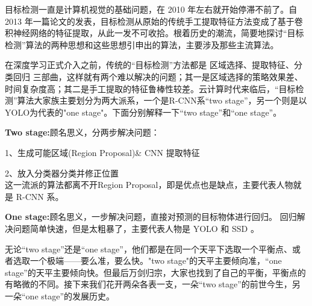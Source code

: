 目标检测一直是计算机视觉的基础问题，在 2010 年左右就开始停滞不前了。自 2013 年一篇论文的发表，目标检测从原始的传统手工提取特征方法变成了基于卷积神经网络的特征提取，从此一发不可收拾。根着历史的潮流，简要地探讨“目标检测”算法的两种思想和这些思想引申出的算法，主要涉及那些主流算法。

在深度学习正式介入之前，传统的“目标检测”方法都是 区域选择、提取特征、分类回归 三部曲，这样就有两个难以解决的问题；其一是区域选择的策略效果差、时间复杂度高；其二是手工提取的特征鲁棒性较差。云计算时代来临后，“目标检测”算法大家族主要划分为两大派系，一个是R-CNN系“two stage”，另一个则是以YOLO为代表的"one stage"。下面分别解释一下“two stage”和“one stage”。

\textbf{Two stage:}顾名思义，分两步解决问题：

1、生成可能区域(Region Proposal)\& CNN 提取特征 

2、放入分类器分类并修正位置 \\
这一流派的算法都离不开Region Proposal，即是优点也是缺点，主要代表人物就是 R-CNN 系。

\textbf{One stage:}顾名思义，一步解决问题，直接对预测的目标物体进行回归。
回归解决问题简单快速，但是太粗暴了，主要代表人物是 YOLO 和 SSD 。

无论“two stage”还是“one stage”，他们都是在同一个天平下选取一个平衡点、或者选取一个极端——要么准，要么快。"two stage"的天平主要倾向准，“one stage”的天平主要倾向快。但最后万剑归宗，大家也找到了自己的平衡，平衡点的有略微的不同。接下来我们花开两朵各表一支，一朵“two stage”的前世今生，另一朵“one stage”的发展历史。


